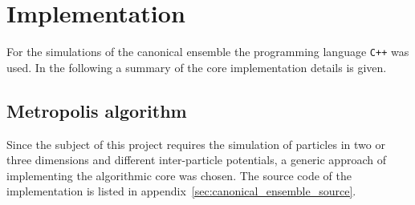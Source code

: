 \documentclass[11pt, a4paper]{article}
\numberwithin{equation}{section}
\begin{document}
\section{Implementation} \label{sec:implementation}
For the simulations of the canonical ensemble the programming language \texttt{C++} was used.
In the following a summary of the core implementation details is given.

\subsection{Metropolis algorithm} \label{sec:Metropolis_alg}
Since the subject of this project requires the simulation of particles in two or three dimensions and different inter-particle potentials, a generic approach of implementing the algorithmic core was chosen.
The source code of the implementation is listed in appendix~\ref{sec:canonical_ensemble_source}.
\end{document}
